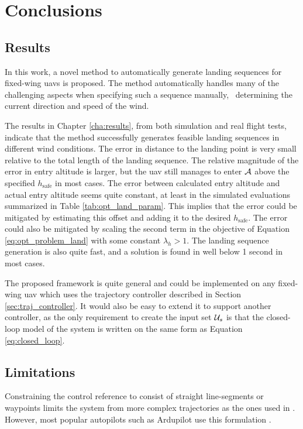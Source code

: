 \chapter{Conclusions}\label{cha:discussion}
\section{Results}
In this work, a novel method to automatically generate landing sequences for fixed-wing \acp{uav} is proposed. 
The method automatically handles many of the challenging aspects when specifying such a sequence manually, \eg\ determining the current 
direction and speed of the wind. 

The results in Chapter \ref{cha:results}, from both simulation and real flight tests, indicate that the method successfully generates feasible landing 
sequences in different wind conditions. The error in distance to the landing point is very small relative to the total length of the landing sequence.
The relative magnitude of the error in entry altitude is larger, but the \ac{uav} still manages to enter $\mathcal{A}$ above the specified $h_{\text{safe}}$ in most cases. 
The error between calculated entry altitude and actual entry altitude seems quite constant, at least in the simulated evaluations summarized in Table \ref{tab:opt_land_param}. 
This implies that the error could be mitigated by estimating this offset and adding it to the desired $h_{\text{safe}}$. The error could also be mitigated by scaling the second term in the objective of 
Equation \ref{eq:opt_problem_land} with some constant $\lambda_h>1$. The landing sequence generation is also quite fast, and a solution is found in well below 1 second in most cases.

The proposed framework is quite general and could be implemented on any fixed-wing \ac{uav} which uses the trajectory controller described in Section \ref{sec:traj_controller}. 
It would also be easy to extend it to support another controller, as the only requirement to create the input set $\mathcal{U}_s$ is that the closed-loop model of the system is written on the same form as 
Equation \ref{eq:closed_loop}.

\section{Limitations}
Constraining the control reference to consist of straight line-segments or waypoints limits the system from more complex trajectories as the ones used in \cite{emergency_landing}. However, 
most popular autopilots such as Ardupilot use this formulation \cite{arduplane}. 

